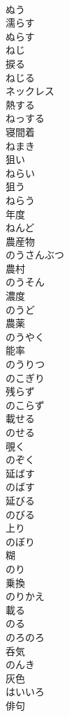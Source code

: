 \documentclass[8pt]{extreport}
\begin{document}
\begin{CJK}{UTF8}{min}
\\	ぬう	
\\	濡らす 
\\	ぬらす	
\\	ねじ	
\\	捩る 
\\	ねじる	
\\	ネックレス	
\\	熱する 
\\	ねっする	
\\	寝間着 
\\	ねまき	
\\	狙い 
\\	ねらい	
\\	狙う 
\\	ねらう	
\\	年度 
\\	ねんど	
\\	農産物 
\\	のうさんぶつ	
\\	農村 
\\	のうそん	
\\	濃度 
\\	のうど	
\\	農薬 
\\	のうやく	
\\	能率 
\\	のうりつ	
\\	のこぎり	
\\	残らず 
\\	のこらず	
\\	載せる 
\\	のせる	
\\	覗く 
\\	のぞく	
\\	延ばす 
\\	のばす	
\\	延びる 
\\	のびる	
\\	上り 
\\	のぼり	
\\	糊 
\\	のり	
\\	乗換 
\\	のりかえ	
\\	載る 
\\	のる	
\\	のろのろ	
\\	呑気 
\\	のんき	
\\	灰色 
\\	はいいろ	
\\	俳句 

\end{CJK}
\end{document}
